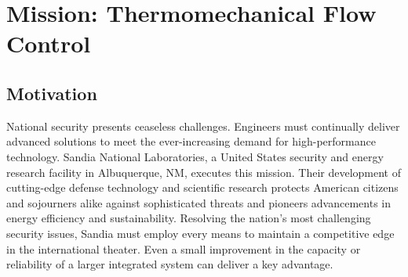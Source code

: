 \documentclass[12pt, letterpaper]{report}%
\begin{document}

\chapter{Mission: Thermomechanical Flow Control}
\label{chap:intro}

	\section{Motivation}
	\label{sec:intro:motive}

		National security presents ceaseless challenges.
		Engineers must continually deliver advanced solutions to meet the ever-increasing demand for high-performance technology.
		Sandia National Laboratories, a United States security and energy research facility in Albuquerque, NM, executes this mission.
		Their development of cutting-edge defense technology and scientific research protects American citizens and sojourners alike against sophisticated threats
		and pioneers advancements in energy efficiency and sustainability.
		Resolving the nation's most challenging security issues, Sandia must employ every means to maintain a competitive edge in the international theater.
		Even a small improvement in the capacity or reliability of a larger integrated system can deliver a key advantage.
\end{document}
